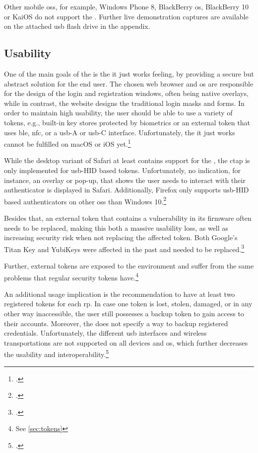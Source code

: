 Other mobile \glspl{os}, for example, Windows Phone 8, BlackBerry \gls{os}, BlackBerry 10 or KaiOS do not support the \wa. Further live demonstration captures are available on the attached \gls{usb} flash drive in the appendix.

\subsection{Usability}

One of the main goals of the \wa{} is the \frqq it just works\flqq{} feeling, by providing a secure but abstract solution for the end user. The chosen web browser and \gls{os} are responsible for the design of the login and registration windows, often being native overlays, while in contrast, the website designs the traditional login masks and forms. In order to maintain high usability, the user should be able to use a variety of tokens, e.g., built-in key stores protected by biometrics or an external token that uses \gls{ble}, \gls{nfc}, or a \gls{usb}-A or \gls{usb}-C interface. Unfortunately, the \frqq it just works\flqq{} cannot be fulfilled on macOS or iOS yet.\footcites[See][84]{fido-ct-6}

While the desktop variant of Safari at least contains support for the \wa, the \gls{ctap} is only implemented for \gls{usb}-HID based tokens. Unfortunately, no indication, for instance, an overlay or pop-up, that shows the user needs to interact with their authenticator is displayed in Safari. Additionally, Firefox only supports \gls{usb}-HID based authenticators on other \glspl{os} than Windows 10.\footcites[See][]{rust-authenticator}

Besides that, an external token that contains a vulnerability in its firmware often needs to be replaced, making this both a massive usability loss, as well as increasing security risk when not replacing the affected token. Both Google's Titan Key and YubiKeys were affected in the past and needed to be replaced.\footcites[See][]{yubikey-heise}[See][]{titan-key}

Further, external tokens are exposed to the environment and suffer from the same problems that regular security tokens have.\footnote{See \autoref{sec:tokens}}

An additional usage implication is the recommendation to have at least two registered tokens for each \gls{rp}. In case one token is lost, stolen, damaged, or in any other way inaccessible, the user still possesses a backup token to gain access to their accounts. Moreover, the \wa{} does not specify a way to backup registered credentials. Unfortunately, the different \gls{usb} interfaces and wireless transportations are not supported on all devices and \gls{os}, which further decreases the usability and interoperability.\footcites[See][Chapter 13.6]{w3c}[See][15]{das2018johnny}

